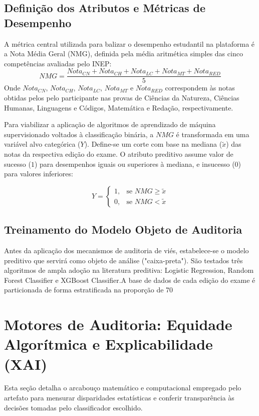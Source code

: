 \subsection{Definição dos Atributos e Métricas de Desempenho}
A métrica central utilizada para balizar o desempenho estudantil na plataforma é a Nota Média Geral (NMG), definida pela média aritmética simples das cinco competências avaliadas pelo INEP:
\[
NMG=\frac{Nota_{CN}+Nota_{CH}+Nota_{LC}+Nota_{MT}+Nota_{RED}}{5}
\]
Onde $Nota_{CN}$, $Nota_{CH}$, $Nota_{LC}$, $Nota_{MT}$ e $Nota_{RED}$ correspondem às notas obtidas pelos pelo participante nas provas de Ciências da Natureza, Ciências Humanas, Linguagens e Códigos, Matemática e Redação, respectivamente.

Para viabilizar a aplicação de algoritmos de aprendizado de máquina supervisionado voltados à classificação binária, a $NMG$ é transformada em uma variável alvo categórica ($Y$). Define-se um corte com base na mediana ($\tilde{x}$) das notas da respectiva edição do exame. O atributo preditivo assume valor de sucesso ($1$) para desempenhos iguais ou superiores à mediana, e insucesso ($0$) para valores inferiores:

\[
Y = \begin{cases} 1, & \text{se } NMG \geq \tilde{x} \\ 0, & \text{se } NMG < \tilde{x} \end{cases}
\]

\subsection{Treinamento do Modelo Objeto de Auditoria}Antes da aplicação dos mecanismos de auditoria de viés, estabelece-se o modelo preditivo que servirá como objeto de análise ("caixa-preta"). São testados três algoritmos de ampla adoção na literatura preditiva: Logistic Regression, Random Forest Classifier e XGBoost Classifier.A base de dados de cada edição do exame é particionada de forma estratificada na proporção de 70%

\section{Motores de Auditoria: Equidade Algorítmica e Explicabilidade (XAI)}
Esta seção detalha o arcabouço matemático e computacional empregado pelo artefato para mensurar disparidades estatísticas e conferir transparência às decisões tomadas pelo classificador escolhido.

